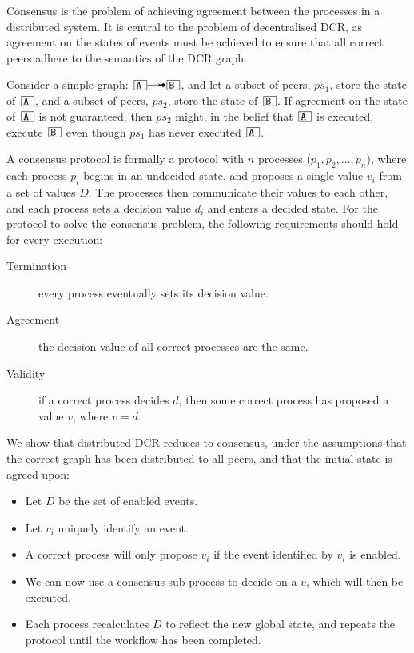 \documentclass{article}
\begin{document}
		Consensus is the problem of achieving agreement between the processes in a distributed system.
		It is central to the problem of decentralised DCR, as agreement on the states of events must be achieved to ensure that all correct peers adhere to the semantics of the DCR graph.

		Consider a simple graph: $\ev{A} \crel \ev{B}$, and let a subset of peers, $ps_1$, store the state of $\ev{A}$, and a subset of peers, $ps_2$, store the state of $\ev{B}$.
		If agreement on the state of $\ev{A}$ is not guaranteed, then $ps_2$ might, in the belief that $\ev{A}$ is executed, execute $\ev{B}$ even though $ps_1$ has never executed $\ev{A}$.

		A consensus protocol is formally a protocol with $n$ processes ($p_1, p_2, \dots, p_{n}$), where each process $p_i$ begins in an undecided state, and proposes a single value $v_i$ from a set of values $D$. The processes then communicate their values to each other, and each process sets a decision value $d_i$ and enters a decided state.
		For the protocol to solve the consensus problem, the following requirements should hold for every execution:
		\begin{description}
			\item[Termination] every process eventually sets its decision value.
			\item[Agreement] the decision value of all correct processes are the same.
			\item[Validity] if a correct process decides $d$, then some correct process has proposed a value $v$, where $v = d$.
		\end{description}

		We show that distributed DCR reduces to consensus, under the assumptions that the correct graph has been distributed to all peers, and that the initial state is agreed upon:
		\begin{itemize}
			\item Let $D$ be the set of enabled events.
			\item Let $v_i$ uniquely identify an event.
			\item A correct process will only propose $v_i$ if the event identified by $v_i$ is enabled.
			\item We can now use a consensus sub-process to decide on a $v$, which will then be executed.
			\item Each process recalculates $D$ to reflect the new global state, and repeats the protocol until the workflow has been completed.
		\end{itemize}
\end{document}
